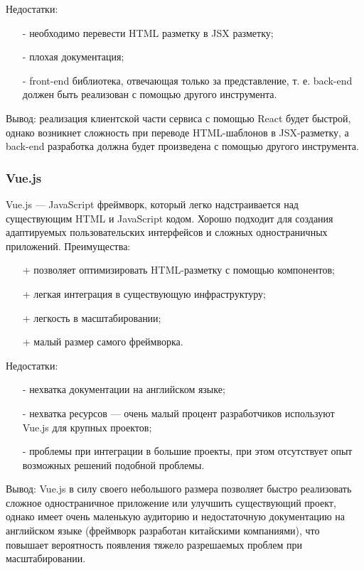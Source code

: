 \documentclass[a4paper,12pt]{article}
\begin{document}
Недостатки:
\begin{itemize}
	\item[-] необходимо перевести HTML разметку в JSX разметку;
	\item[-] плохая документация;
	\item[-] front-end библиотека, отвечающая только за представление, т. е. back-end должен быть реализован с помощью другого инструмента.
\end{itemize}

Вывод: реализация клиентской части сервиса с помощью React будет быстрой, однако возникнет сложность при переводе HTML-шаблонов в JSX-разметку, а back-end разработка должна будет произведена с помощью другого инструмента.\\



\subsubsection{Vue.js}

Vue.js — JavaScript фреймворк, который легко надстраивается над существующим HTML и JavaScript кодом. Хорошо подходит для создания адаптируемых пользовательских интерфейсов и сложных одностраничных приложений.
Преимущества:
\begin{itemize}
	\item[+] позволяет оптимизировать HTML-разметку с помощью компонентов;
	\item[+] легкая интеграция в существующую инфраструктуру;
	\item[+] легкость в масштабировании;
	\item[+] малый размер самого фреймворка.
\end{itemize}

Недостатки:
\begin{itemize}
	\item[-] нехватка документации на английском языке;
	\item[-] нехватка ресурсов — очень малый процент разработчиков используют Vue.js для крупных проектов;
	\item[-] проблемы при интеграции в большие проекты, при этом отсутствует опыт возможных решений подобной проблемы.
\end{itemize}

Вывод: Vue.js в силу своего небольшого размера позволяет быстро реализовать сложное одностраничное приложение или улучшить существующий проект, однако имеет очень маленькую аудиторию и недостаточную документацию на английском языке (фреймворк разработан китайскими компаниями), что повышает вероятность появления тяжело разрешаемых проблем при масштабировании.\\
\end{document}
